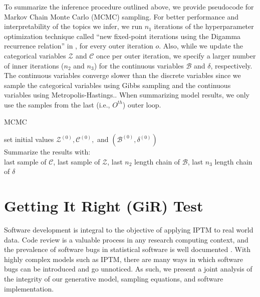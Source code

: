 \documentclass[a4paper]{article}
\begin{document}
 To summarize the inference procedure outlined above, we provide pseudocode for Markov Chain Monte Carlo (MCMC) sampling. For better performance and interpretability of the topics we infer, we run $n_1$ iterations of the hyperparameter optimization technique called ``new fixed-point iterations using the Digamma recurrence relation'' in \cite{wallach2008structured}, for every outer iteration $o$. Also, while we update the categorical variables $\mathcal{Z}$ and $\mathcal{C}$ once per outer iteration, we specify a larger number of inner iterations ($n_2$ and $n_3$) for the continuous variables $\mathcal{B}$ and $\delta$, respectively. The continuous variables converge slower than the discrete variables since we sample the categorical variables using Gibbs sampling and the continuous variables using Metropolis-Hastings.. When summarizing model results, we only use the samples from the last (i.e., $O^{th}$) outer loop.
 \begin{algorithm}[H]
 	\SetAlgoLined
 	\caption{MCMC}
 	set initial values $\mathcal{Z}^{(0)}, \mathcal{C}^{(0)}, $ and $(\mathcal{B}^{(0)}, \delta^{(0)})$\\
 		Summarize the results with:\\
 	last sample of $\mathcal{C}$, last sample of $\mathcal{Z}$, last $n_2$ length chain of $\mathcal{B}$, last $n_3$ length chain of $\delta$ 
 \end{algorithm}
 
   \section{Getting It Right (GiR) Test}
   Software development is integral to the objective of applying IPTM to real world data. Code review is a valuable process in any research computing context, and the prevalence of software bugs in statistical software is well documented \citep[e.g., ][]{altman2004numerical,mccullough2009accuracy}.  With highly complex models such as IPTM, there are many ways in which software bugs can be introduced and go unnoticed. As such, we present a joint analysis of the integrity of our generative model, sampling equations, and software implementation. 
 
\end{document}
